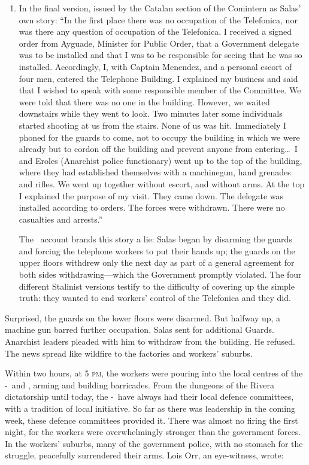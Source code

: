 {\begin{enumerate}
  \item In the final version, issued by the Catalan section of the Comintern as Salas’ own story: ``In the first place there was no occupation of the Telefonica, nor was there any question of occupation of the Telefonica. I received a signed order from Ayguade, Minister for Public Order, that a Government delegate was to be installed and that I was to be responsible for seeing that he was so installed. Accordingly, I, with Captain Menendez, and a personal escort of four men, entered the Telephone Building. I explained my business and said that I wished to speak with some responsible member of the Committee. We were told that there was no one in the building. However, we waited downstairs while they went to look. Two minutes later some individuals started shooting at us from the stairs. None of us was hit. Immediately I phoned for the guards to come, not to occupy the building in which we were already but to cordon off the building and prevent anyone from entering\dots\ I and Eroles (Anarchist police functionary) went up to the top of the building, where they had established themselves with a machinegun, hand grenades and rifles. We went up together without escort, and without arms. At the top I explained the purpose of my visit. They came down. The delegate was installed according to orders. The forces were withdrawn. There were no casualties and arrests.''
  
  The \CNT\ account brands this story a lie: Salas began by disarming the guards and forcing the telephone workers to put their hands up; the guards on the upper floors withdrew only the next day as part of a general agreement for both sides withdrawing---which the Government promptly violated. The four different Stalinist versions testify to the difficulty of covering up the simple truth: they wanted to end workers’ control of the Telefonica and they did.
\end{enumerate}

}

Surprised, the guards on the lower floors were disarmed. But halfway up, a machine gun barred further occupation. Salas sent for additional Guards. Anarchist leaders pleaded with him to withdraw from the building. He refused. The news spread like wildfire to the factories and workers’ suburbs.

Within two hours, at 5 \textsc{pm}, the workers were pouring into the local centres of the \CNT-\FAI\ and \POUM, arming and building barricades. From the dungeons of the Rivera dictatorship until today, the \CNT-\FAI\ have always had their local defence committees, with a tradition of local initiative. So far as there was leadership in the coming week, these defence committees provided it. There was almost no firing the first night, for the workers were overwhelmingly stronger than the government forces. In the workers’ suburbs, many of the government police, with no stomach for the struggle, peacefully surrendered their arms. Lois Orr, an eye-witness, wrote:

